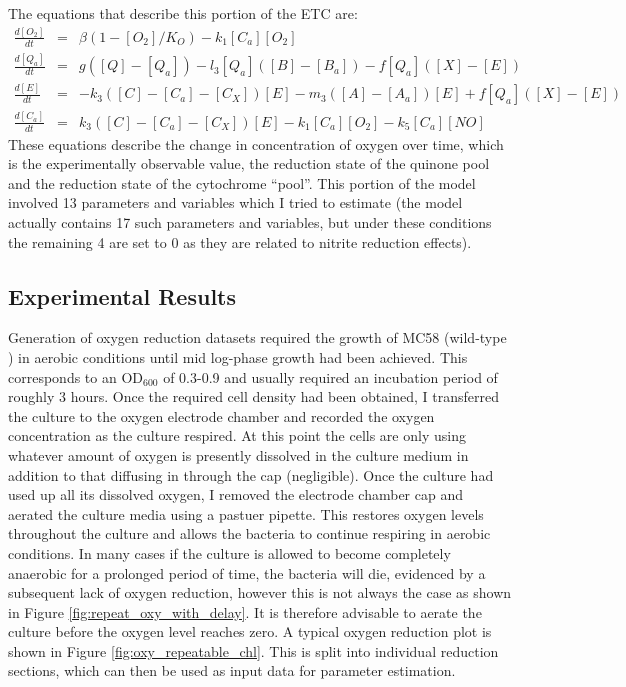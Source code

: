 The equations that describe this portion of the ETC are:
\begin{eqnarray*}
\frac{d[O_2]}{dt} & = & \beta(1-[O_2]/K_O) - k_{1}[C_a][O_2]\\
\frac{d[Q_a]}{dt} & = & g([Q] - [Q_a]) - l_3[Q_a]([B] - [B_a]) - f[Q_a]([X]-[E])\\
\frac{d[E]}{dt} & = & -k_3([C] - [C_a] - [C_X])[E]  - m_3([A] - [A_a])[E] + f[Q_a]([X]-[E])\\
\frac{d[C_a]}{dt} & = & k_3([C] - [C_a] - [C_X])[E] - k_{1}[C_a][O_2] - k_5[C_a][NO]
\end{eqnarray*}
These equations describe the change in concentration of oxygen over time, which is the experimentally observable value, the reduction state of the quinone pool and the reduction state of the cytochrome ``pool''. This portion of the model involved 13 parameters and variables which I tried to estimate (the model actually contains 17 such parameters and variables, but under these conditions the remaining 4 are set to 0 as they are related to nitrite reduction effects).

\subsection{Experimental Results}

Generation of oxygen reduction datasets required the growth of MC58 (wild-type \Nsm{}) in aerobic conditions until mid log-phase growth had been achieved. This corresponds to an $\mathrm{OD}_{600}$ of 0.3-0.9 and usually required an incubation period of roughly 3 hours. Once the required cell density had been obtained, I transferred the culture to the oxygen electrode chamber and recorded the oxygen concentration as the culture respired. At this point the cells are only using whatever amount of oxygen is presently dissolved in the culture medium in addition to that diffusing in through the cap (negligible). Once the culture had used up all its dissolved oxygen, I removed the electrode chamber cap and aerated the culture media using a pastuer pipette. This restores oxygen levels throughout the culture and allows the bacteria to continue respiring in aerobic conditions. In many cases if the culture is allowed to become completely anaerobic for a prolonged period of time, the bacteria will die, evidenced by a subsequent lack of oxygen reduction, however this is not always the case as shown in Figure \ref{fig:repeat_oxy_with_delay}. It is therefore advisable to aerate the culture before the oxygen level reaches zero. A typical oxygen reduction plot is shown in Figure \ref{fig:oxy_repeatable_chl}. This is split into individual reduction sections, which can then be used as input data for parameter estimation.


